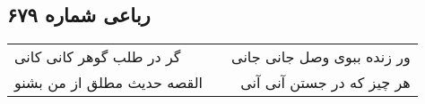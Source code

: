 \begin{center}
\section*{رباعی شماره ۶۷۹}
\label{sec:sh679}
\begin{longtable}{l p{0.5cm} r}
گر در طلب گوهر کانی کانی
&&
ور زنده ببوی وصل جانی جانی
\\
القصه حدیث مطلق از من بشنو
&&
هر چیز که در جستن آنی آنی
\\
\end{longtable}
\end{center}
